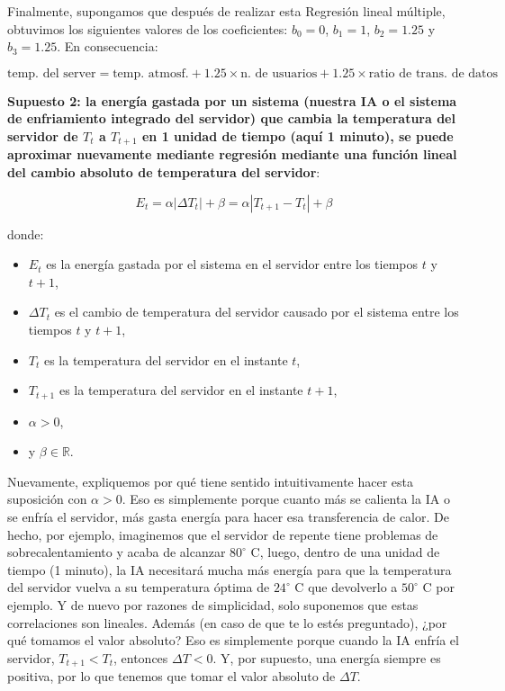 \documentclass[
]{book}
\providecommand{\tightlist}{%
  \setlength{\itemsep}{0pt}\setlength{\parskip}{0pt}}
\begin{document}
Finalmente, supongamos que después de realizar esta Regresión lineal múltiple, obtuvimos los siguientes valores de los coeficientes: \(b_0 = 0\), \(b_1 = 1\), \(b_2 = 1.25\) y \(b_3 = 1.25\). En consecuencia:

\[\textrm{temp. del server} = \textrm{temp. atmosf.} + 1.25 \times \textrm{n. de usuarios} + 1.25 \times \textrm{ratio de trans. de datos} \]

\textbf{Supuesto 2: la energía gastada por un sistema (nuestra IA o el sistema de enfriamiento integrado del servidor) que cambia la temperatura del servidor de \(T_t\) a \(T_{t + 1}\) en 1 unidad de tiempo (aquí 1 minuto), se puede aproximar nuevamente mediante regresión mediante una función lineal del cambio absoluto de temperatura del servidor}:

\[E_t = \alpha |\Delta T_t| + \beta = \alpha |T_{t+1} - T_t| + \beta\]

donde:

\begin{itemize}
\tightlist
\item
  \(E_t\) es la energía gastada por el sistema en el servidor entre los tiempos \(t\) y \(t +1\),
\item
  \(\Delta T_t\) es el cambio de temperatura del servidor causado por el sistema entre los tiempos \(t\) y \(t +1\),
\item
  \(T_t\) es la temperatura del servidor en el instante \(t\),
\item
  \(T_{t + 1}\) es la temperatura del servidor en el instante \(t +1\),
\item
  \(\alpha > 0\),
\item
  y \(\beta \in \mathbb{R}\).
\end{itemize}

Nuevamente, expliquemos por qué tiene sentido intuitivamente hacer esta suposición con \(\alpha>0\). Eso es simplemente porque cuanto más se calienta la IA o se enfría el servidor, más gasta energía para hacer esa transferencia de calor. De hecho, por ejemplo, imaginemos que el servidor de repente tiene problemas de sobrecalentamiento y acaba de alcanzar \(80^{\circ}\) C, luego, dentro de una unidad de tiempo (1 minuto), la IA necesitará mucha más energía para que la temperatura del servidor vuelva a su temperatura óptima de \(24^{\circ}\) C que devolverlo a \(50^{\circ}\) C por ejemplo. Y de nuevo por razones de simplicidad, solo suponemos que estas correlaciones son lineales. Además (en caso de que te lo estés preguntado), ¿por qué tomamos el valor absoluto? Eso es simplemente porque cuando la IA enfría el servidor, \(T_{t + 1}<T_t\), entonces \(\Delta T <0\). Y, por supuesto, una energía siempre es positiva, por lo que tenemos que tomar el valor absoluto de \(\Delta T\).
\end{document}
